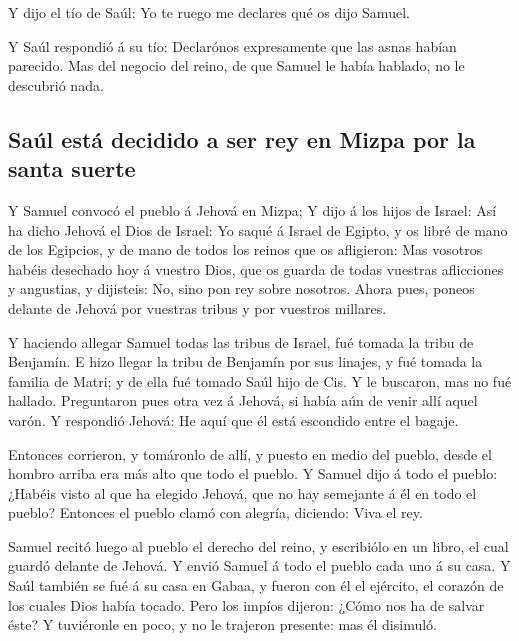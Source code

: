  Y dijo el tío de Saúl: Yo te ruego me declares qué os
dijo Samuel.

 Y Saúl respondió á su tío: Declarónos expresamente que
las asnas habían parecido. Mas del negocio del reino, de que Samuel le
había hablado, no le descubrió nada.

\hypertarget{sauxfal-estuxe1-decidido-a-ser-rey-en-mizpa-por-la-santa-suerte}{%
\subsection{Saúl está decidido a ser rey en Mizpa por la santa
suerte}\label{sauxfal-estuxe1-decidido-a-ser-rey-en-mizpa-por-la-santa-suerte}}

 Y Samuel convocó el pueblo á Jehová en Mizpa;
 Y dijo á los hijos de Israel: Así ha dicho Jehová el
Dios de Israel: Yo saqué á Israel de Egipto, y os libré de mano de los
Egipcios, y de mano de todos los reinos que os afligieron:
 Mas vosotros habéis desechado hoy á vuestro Dios, que os
guarda de todas vuestras aflicciones y angustias, y dijisteis: No, sino
pon rey sobre nosotros. Ahora pues, poneos delante de Jehová por
vuestras tribus y por vuestros millares.

 Y haciendo allegar Samuel todas las tribus de Israel,
fué tomada la tribu de Benjamín.  E hizo llegar la tribu
de Benjamín por sus linajes, y fué tomada la familia de Matri; y de ella
fué tomado Saúl hijo de Cis. Y le buscaron, mas no fué hallado.
 Preguntaron pues otra vez á Jehová, si había aún de
venir allí aquel varón. Y respondió Jehová: He aquí que él está
escondido entre el bagaje.

 Entonces corrieron, y tomáronlo de allí, y puesto en
medio del pueblo, desde el hombro arriba era más alto que todo el
pueblo.  Y Samuel dijo á todo el pueblo: ¿Habéis visto al
que ha elegido Jehová, que no hay semejante á él en todo el pueblo?
Entonces el pueblo clamó con alegría, diciendo: Viva el rey.

 Samuel recitó luego al pueblo el derecho del reino, y
escribiólo en un libro, el cual guardó delante de Jehová.
 Y envió Samuel á todo el pueblo cada uno á su casa. Y
Saúl también se fué á su casa en Gabaa, y fueron con él el ejército, el
corazón de los cuales Dios había tocado.  Pero los impíos
dijeron: ¿Cómo nos ha de salvar éste? Y tuviéronle en poco, y no le
trajeron presente: mas él disimuló.

